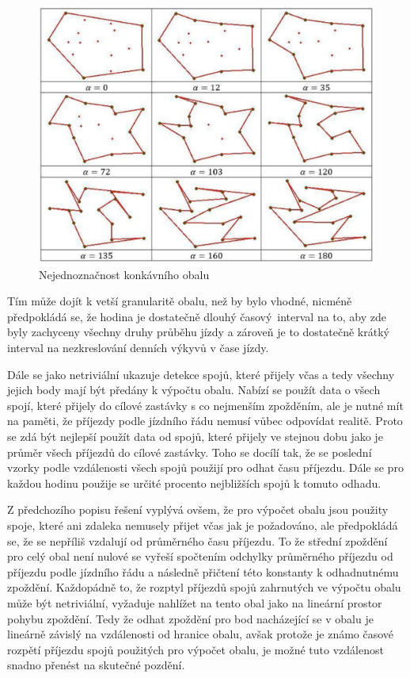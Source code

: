 \begin{figure}
	\centering
  \includegraphics[width=0.8\linewidth]{../img/konkavni_obal_nejednoznacny.png}
  \caption{Nejednoznačnost konkávního obalu}
  \label{fig:konkavni_obal_nejednoznacny}
\end{figure}

 Tím může dojít k vetší granularitě obalu, než by bylo vhodné, nicméně předpokládá se, že hodina je dostatečně dlouhý časový interval na to, aby zde byly zachyceny všechny druhy průběhu jízdy a zároveň je to dostatečně krátký interval na nezkreslování denních výkyvů v čase jízdy.

 \bigbreak

Dále se jako netriviální ukazuje detekce spojů, které přijely včas a tedy všechny jejich body mají být předány k výpočtu obalu. Nabízí se použít data o všech spojí, které přijely do cílové zastávky s co nejmenším zpožděním, ale je nutné mít na paměti, že příjezdy podle jízdního řádu nemusí vůbec odpovídat realitě. Proto se zdá být nejlepší použít data od spojů, které přijely ve stejnou dobu jako je průměr všech příjezdů do cílové zastávky. Toho se docílí tak, že se poslední vzorky podle vzdálenosti všech spojů použijí pro odhat času příjezdu. Dále se pro každou hodinu použije se určité procento nejbližších spojů k tomuto odhadu.

\bigbreak

Z předchozího popisu řešení vyplývá ovšem, že pro výpočet obalu jsou použity spoje, které ani zdaleka nemusely přijet včas jak je požadováno, ale předpokládá se, že se nepříliš vzdalují od průměrného času příjezdu. To že střední zpoždění pro celý obal není nulové se vyřeší spočtením odchylky průměrného příjezdu od příjezdu podle jízdního řádu a následně přičtení této konstanty k odhadnutnému zpoždění. Každopádně to, že rozptyl příjezdů spojů zahrnutých ve výpočtu obalu může být netriviální, vyžaduje nahlížet na tento obal jako na lineární prostor pohybu zpoždění. Tedy že odhat zpoždění pro bod nacházející se v obalu je lineárně závislý na vzdálenosti od hranice obalu, avšak protože je známo časové rozpětí příjezdu spojů použitých pro výpočet obalu, je možné tuto vzdálenost snadno přenést na skutečné pozdění.

